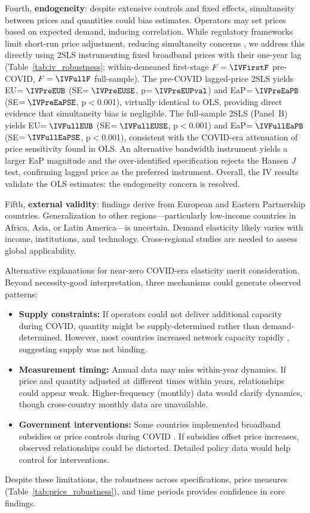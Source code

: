 Fourth, \textbf{endogeneity}: despite extensive controls and fixed effects, simultaneity
between prices and quantities could bias estimates. Operators may set prices based on
expected demand, inducing correlation. While regulatory frameworks limit short-run price
adjustment, reducing simultaneity concerns \citep{laffont2000competition}, we address this
directly using 2SLS instrumenting fixed broadband prices with their one-year lag
(Table~\ref{tab:iv_robustness}; within-demeaned first-stage $F = \IVFirstF$ pre-COVID,
$F = \IVFullF$ full-sample). The pre-COVID lagged-price 2SLS yields EU$=\IVPreEUB$
(SE$=\IVPreEUSE$, p$=\IVPreEUPval$) and EaP$=\IVPreEaPB$ (SE$=\IVPreEaPSE$, p$<$0.001),
virtually identical to OLS, providing direct evidence that simultaneity bias is negligible.
The full-sample 2SLS (Panel~B) yields EU$=\IVFullEUB$ (SE$=\IVFullEUSE$, p$<$0.001)
and EaP$=\IVFullEaPB$ (SE$=\IVFullEaPSE$, p$<$0.001), consistent with the COVID-era
attenuation of price sensitivity found in OLS. An alternative bandwidth instrument yields
a larger EaP magnitude and the over-identified specification rejects the Hansen $J$ test,
confirming lagged price as the preferred instrument. Overall, the IV results validate
the OLS estimates: the endogeneity concern is resolved.

Fifth, \textbf{external validity}: findings derive from European and Eastern Partnership countries. Generalization to other regions---particularly low-income countries in Africa, Asia, or Latin America---is uncertain. Demand elasticity likely varies with income, institutions, and technology. Cross-regional studies are needed to assess global applicability.

Alternative explanations for near-zero COVID-era elasticity merit consideration. Beyond necessity-good interpretation, three mechanisms could generate observed patterns:

\begin{itemize}
    \item \textbf{Supply constraints:} If operators could not deliver additional capacity during COVID, quantity might be supply-determined rather than demand-determined. However, most countries increased network capacity rapidly \citep{oecd2021broadband}, suggesting supply was not binding.
    
    \item \textbf{Measurement timing:} Annual data may miss within-year dynamics. If price and quantity adjusted at different times within years, relationships could appear weak. Higher-frequency (monthly) data would clarify dynamics, though cross-country monthly data are unavailable.
    
    \item \textbf{Government interventions:} Some countries implemented broadband subsidies or price controls during COVID \citep{oecd2021broadband}. If subsidies offset price increases, observed relationships could be distorted. Detailed policy data would help control for interventions.
\end{itemize}

Despite these limitations, the robustness across specifications, price measures (Table~\ref{tab:price_robustness}), and time periods provides confidence in core findings.
